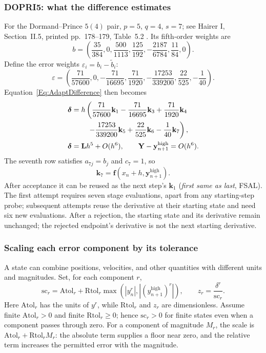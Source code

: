 \subsubsection{DOPRI5: what the difference estimates}
For the Dormand--Prince $5(4)$ pair, $p=5$, $q=4$, $s=7$; see Hairer I,
Section~II.5, printed pp.~178--179, Table~5.2 \cite{HNW1993}.
Its fifth-order weights are
\[
 b=\left(\frac{35}{384},0,\frac{500}{1113},\frac{125}{192},
 -\frac{2187}{6784},\frac{11}{84},0\right).
\]
Define the error weights $\varepsilon_i=b_i-\widetilde b_i$:
\[
 \varepsilon=\left(\frac{71}{57600},0,-\frac{71}{16695},
 \frac{71}{1920},-\frac{17253}{339200},\frac{22}{525},-\frac1{40}\right).
\]
Equation~\ref{Eq:AdaptDifference} then becomes
\begin{equation}\label{Eq:AdaptDopriDifference}
\begin{aligned}
 \boldsymbol\delta
 &=h\left(\frac{71}{57600}\mathbf k_1
       -\frac{71}{16695}\mathbf k_3+\frac{71}{1920}\mathbf k_4\right.\\
 &\hspace{2.2em}\left.
       -\frac{17253}{339200}\mathbf k_5+\frac{22}{525}\mathbf k_6
       -\frac1{40}\mathbf k_7\right),\\
 \boldsymbol\delta&=\mathbf L h^5+O(h^6),\qquad
 \mathbf Y-\mathbf y_{n+1}^{\mathrm{high}}=O(h^6).
\end{aligned}
\end{equation}
The seventh row satisfies $a_{7j}=b_j$ and $c_7=1$, so
\[
 \mathbf k_7=\mathbf f(x_n+h,\mathbf y_{n+1}^{\mathrm{high}}).
\]
After acceptance it can be reused as the next step's $\mathbf k_1$
(\emph{first same as last}, FSAL). The first attempt requires seven stage evaluations, apart from any
starting-step probe; subsequent attempts reuse the derivative at their
starting state and need six new evaluations. After a rejection, the starting state and its derivative
remain unchanged; the rejected endpoint's derivative is not the next
starting derivative.

\subsubsection{Scaling each error component by its tolerance}
A state can combine positions, velocities, and other quantities with different
units and magnitudes. Set, for each component $r$,
\begin{equation}\label{Eq:AdaptToleranceScale}
 \mathrm{sc}_r=\mathrm{Atol}_r
 +\mathrm{Rtol}_r\max\!\left(|y_n^r|,
                      |(y_{n+1}^{\mathrm{high}})^r|\right),
 \qquad z_r=\frac{\delta^r}{\mathrm{sc}_r}.
\end{equation}
Here $\mathrm{Atol}_r$ has the units of $y^r$, while $\mathrm{Rtol}_r$ and
$z_r$ are dimensionless. Assume finite
$\mathrm{Atol}_r>0$ and finite $\mathrm{Rtol}_r\geq0$; hence
$\mathrm{sc}_r>0$ for finite states even when a component passes through zero.
For a component of magnitude $M_r$, the scale is
$\mathrm{Atol}_r+\mathrm{Rtol}_r M_r$: the absolute term supplies a floor near
zero, and the relative term increases the permitted error with the magnitude.

